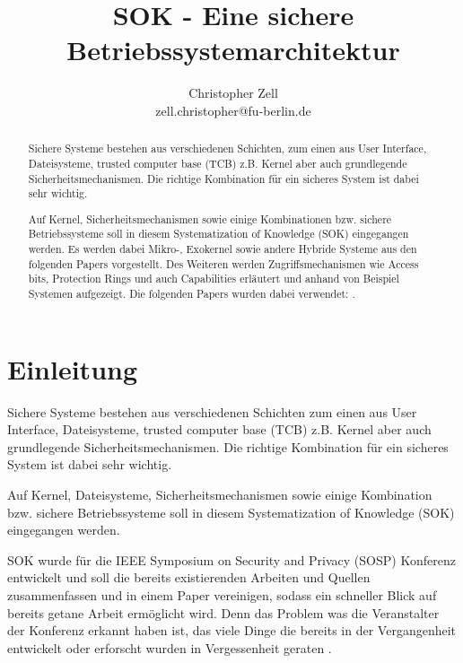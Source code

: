\documentclass[11pt,technote]{IEEEtran}
\title{SOK - Eine sichere Betriebssystemarchitektur}%
\author{Christopher Zell\\
        zell.christopher@fu-berlin.de}
\begin{document}
\maketitle

  \begin{abstract}
    Sichere Systeme bestehen aus verschiedenen Schichten, zum einen aus User Interface, Dateisysteme, trusted computer base (TCB)
    z.B. Kernel aber auch grundlegende Sicherheitsmechanismen. Die richtige Kombination f\"ur ein sicheres System ist dabei sehr wichtig.
    
    Auf Kernel, Sicherheitsmechanismen sowie einige Kombinationen bzw. sichere Betriebssysteme soll in diesem
    Systematization of Knowledge (SOK) eingegangen werden.
    Es werden dabei Mikro-, Exokernel sowie andere Hybride Systeme aus den folgenden Papers 
    \cite{inproc:micro, inproc:exo, inproc:spin, inproc:eros, inproc:asbestos} vorgestellt.
    Des Weiteren werden Zugriffsmechanismen wie Access bits, Protection Rings und auch Capabilities erl\"autert
    und anhand von Beispiel Systemen aufgezeigt. Die folgenden Papers wurden dabei verwendet:
    \cite{inproc:multics, inproc:protec-rings, inproc:unix, inproc:plan9, inproc:cap}.
  \end{abstract}
  
  \section{Einleitung} \label{sec:intro} 
    Sichere Systeme bestehen aus verschiedenen Schichten zum einen aus User Interface, Dateisysteme, trusted computer base (TCB)
    z.B. Kernel aber auch grundlegende Sicherheitsmechanismen. Die richtige Kombination f\"ur ein sicheres System ist dabei sehr wichtig.
    
    Auf Kernel, Dateisysteme, Sicherheitsmechanismen sowie einige Kombination bzw. sichere Betriebssysteme soll in diesem
    Systematization of Knowledge (SOK) eingegangen werden.
    
    SOK wurde f\"ur die IEEE Symposium on Security and Privacy (SOSP) Konferenz
    entwickelt und soll die bereits existierenden Arbeiten und Quellen zusammenfassen
    und in einem Paper vereinigen, sodass ein schneller Blick auf bereits getane
    Arbeit erm\"oglicht wird. Denn das Problem was die Veranstalter der Konferenz
    erkannt haben ist, das viele Dinge die bereits in der Vergangenheit entwickelt oder
    erforscht wurden in Vergessenheit geraten \cite{Url:sok}.
    
\end{document}
